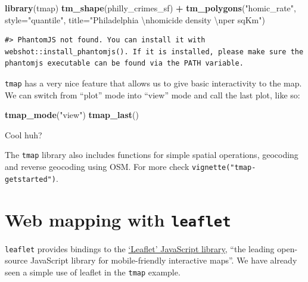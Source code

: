 \documentclass[]{book}
\newenvironment{Shaded}{\begin{snugshade}}{\end{snugshade}}
\newcommand{\KeywordTok}[1]{\textcolor[rgb]{0.13,0.29,0.53}{\textbf{#1}}}
\newcommand{\DataTypeTok}[1]{\textcolor[rgb]{0.13,0.29,0.53}{#1}}
\newcommand{\CharTok}[1]{\textcolor[rgb]{0.31,0.60,0.02}{#1}}
\newcommand{\StringTok}[1]{\textcolor[rgb]{0.31,0.60,0.02}{#1}}
\newcommand{\OperatorTok}[1]{\textcolor[rgb]{0.81,0.36,0.00}{\textbf{#1}}}
\newcommand{\NormalTok}[1]{#1}
\begin{document}
\begin{Shaded}
\begin{Highlighting}[]
\KeywordTok{library}\NormalTok{(tmap)}
\KeywordTok{tm_shape}\NormalTok{(philly_crimes_sf) }\OperatorTok{+}
\StringTok{  }\KeywordTok{tm_polygons}\NormalTok{(}\StringTok{"homic_rate"}\NormalTok{, }
              \DataTypeTok{style=}\StringTok{"quantile"}\NormalTok{, }
              \DataTypeTok{title=}\StringTok{"Philadelphia }\CharTok{\textbackslash{}n}\StringTok{homicide density }\CharTok{\textbackslash{}n}\StringTok{per sqKm"}\NormalTok{)}
\end{Highlighting}
\end{Shaded}

\begin{verbatim}
#> PhantomJS not found. You can install it with webshot::install_phantomjs(). If it is installed, please make sure the phantomjs executable can be found via the PATH variable.
\end{verbatim}

\hypertarget{htmlwidget-5f5f8684d951cb546c80}{}

\texttt{tmap} has a very nice feature that allows us to give basic
interactivity to the map. We can switch from ``plot'' mode into ``view''
mode and call the last plot, like so:

\begin{Shaded}
\begin{Highlighting}[]
\KeywordTok{tmap_mode}\NormalTok{(}\StringTok{"view"}\NormalTok{)}
\KeywordTok{tmap_last}\NormalTok{()}
\end{Highlighting}
\end{Shaded}

\hypertarget{htmlwidget-bb462369a55246093d7c}{}

Cool huh?

The \texttt{tmap} library also includes functions for simple spatial
operations, geocoding and reverse geocoding using OSM. For more check
\texttt{vignette("tmap-getstarted")}.

\section{\texorpdfstring{Web mapping with
\texttt{leaflet}}{Web mapping with leaflet}}\label{web-mapping-with-leaflet}

\texttt{leaflet} provides bindings to the
\href{http://leafletjs.com}{`Leaflet' JavaScript library}, ``the leading
open-source JavaScript library for mobile-friendly interactive maps''.
We have already seen a simple use of leaflet in the \texttt{tmap}
example.
\end{document}
